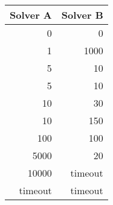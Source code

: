 \documentclass[varwidth=true, border=3pt, convert={size=640x}]{standalone}
\begin{document}
\begin{table}
\begin{tabular}{rr}
 \toprule
    Solver A & Solver B \\ [0.5ex]
 \midrule
0 & 0 \\
1 & 1000 \\
5 & 10 \\
5 & 10 \\
10 & 30 \\
10 & 150 \\
100 & 100 \\
5000 & 20 \\
10000 & timeout \\
timeout & timeout \\
 \bottomrule
\end{tabular}
 \vspace{1cm}
\end{table}
\end{document}
